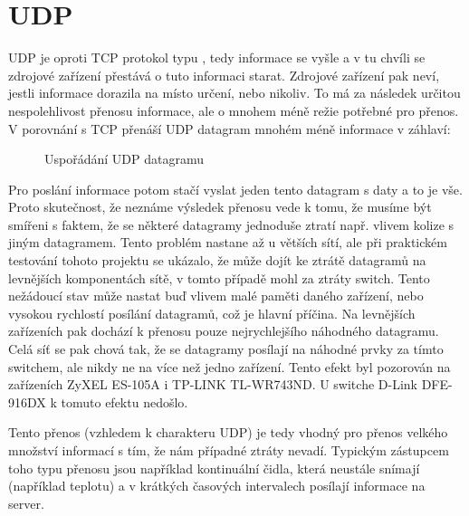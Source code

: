 
\section{UDP}
UDP je oproti TCP protokol typu , tedy informace se vyšle a v tu chvíli se zdrojové zařízení přestává o tuto informaci starat. Zdrojové zařízení pak neví, jestli informace dorazila na místo určení, nebo nikoliv. To má za následek určitou nespolehlivost přenosu informace, ale o mnohem méně režie potřebné pro přenos. V porovnání s TCP přenáší UDP datagram mnohém méně informace v záhlaví:

\begin{figure}[H]
    \centering
	\caption{Uspořádání UDP datagramu}
	\label{fig:udp-datagram}
\end{figure}


Pro poslání informace potom stačí vyslat jeden tento datagram s daty a to je vše. Proto skutečnost, že neznáme výsledek přenosu vede k tomu, že musíme být smířeni s faktem, že se některé datagramy jednoduše ztratí např. vlivem kolize s jiným datagramem. Tento problém nastane až u větších sítí, ale při praktickém testování tohoto projektu se ukázalo, že může dojít ke ztrátě datagramů na levnějších komponentách sítě, v tomto případě mohl za ztráty switch. Tento nežádoucí stav může nastat buď vlivem malé paměti daného zařízení, nebo vysokou rychlostí posílání datagramů, což je hlavní příčina. Na levnějších zařízeních pak dochází k přenosu pouze nejrychlejšího náhodného datagramu. Celá síť se pak chová tak, že se datagramy posílají na náhodné prvky za tímto switchem, ale nikdy ne na více než jedno zařízení. Tento efekt byl pozorován na zařízeních ZyXEL ES-105A i TP-LINK TL-WR743ND. U switche D-Link DFE-916DX k tomuto efektu nedošlo.

Tento přenos (vzhledem k charakteru UDP) je tedy vhodný pro přenos velkého množství informací s tím, že nám případné ztráty nevadí. Typickým zástupcem toho typu přenosu jsou například kontinuální čidla, která neustále snímají (například teplotu) a v krátkých časových intervalech posílají informace na server.